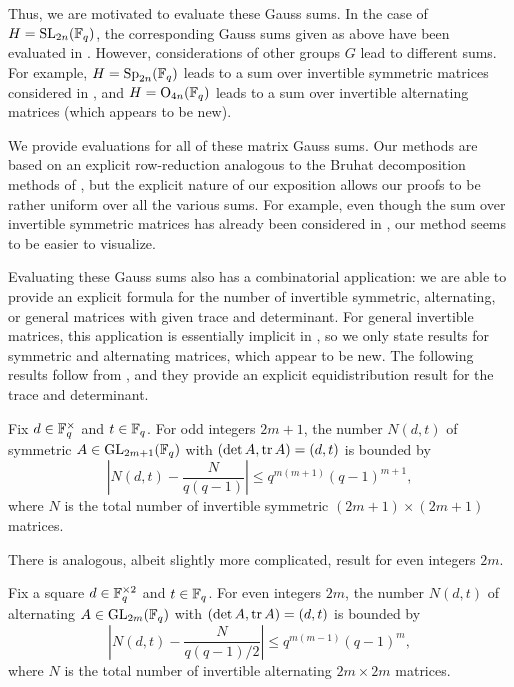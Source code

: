 \documentclass{amsart}
\begin{document}
Thus, we are motivated to evaluate these Gauss sums. In the case of $H=\mathrm{SL}_{2n}(\mathbb F_q)$, the corresponding Gauss sums given as above have been evaluated in \cite{kim-gauss-sum}. However, considerations of other groups $G$ lead to different sums. For example, $H=\mathrm{Sp}_{2n}(\mathbb F_q)$ leads to a sum over invertible symmetric matrices considered in \cite{saito-sym-gauss-sum}, and $H=\mathrm{O}_{4n}(\mathbb F_q)$ leads to a sum over invertible alternating matrices (which appears to be new).

We provide evaluations for all of these matrix Gauss sums. Our methods are based on an explicit row-reduction analogous to the Bruhat decomposition methods of \cite{kim-gauss-sum}, but the explicit nature of our exposition allows our proofs to be rather uniform over all the various sums. For example, even though the sum over invertible symmetric matrices has already been considered in \cite{saito-sym-gauss-sum}, our method seems to be easier to visualize.

Evaluating these Gauss sums also has a combinatorial application: we are able to provide an explicit formula for the number of invertible symmetric, alternating, or general matrices with given trace and determinant. For general invertible matrices, this application is essentially implicit in \cite[Theorem~6.2]{kim-gauss-sum}, so we only state results for symmetric and alternating matrices, which appear to be new. The following results follow from , and they provide an explicit equidistribution result for the trace and determinant.
\begin{theorem}
    Fix $d\in\mathbb F_q^\times$ and $t\in\mathbb F_q$. For odd integers $2m+1$, the number $N(d,t)$ of symmetric $A\in\mathrm{GL}_{2m+1}(\mathbb F_q)$ with $(\det A,\operatorname{tr} A)=(d,t)$ is bounded by
    \[\left|N(d,t)-\frac N{q(q-1)}\right|\le q^{m(m+1)}(q-1)^{m+1},\]
    where $N$ is the total number of invertible symmetric $(2m+1)\times(2m+1)$ matrices.
\end{theorem}
\begin{remark}
    There is analogous, albeit slightly more complicated, result for even integers $2m$.
\end{remark}
\begin{theorem}
    Fix a square $d\in\mathbb F_q^{\times2}$ and $t\in\mathbb F_q$. For even integers $2m$, the number $N(d,t)$ of alternating $A\in\mathrm{GL}_{2m}(\mathbb F_q)$ with $(\det A,\operatorname{tr} A)=(d,t)$ is bounded by
    \[\left|N(d,t)-\frac N{q(q-1)/2}\right|\le q^{m(m-1)}(q-1)^m,\]
    where $N$ is the total number of invertible alternating $2m\times2m$ matrices.
\end{theorem}
\end{document}
